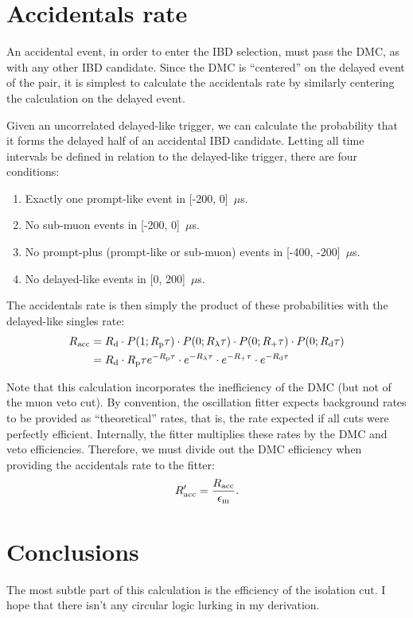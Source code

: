 \documentclass[../thesis.tex]{subfiles}
\begin{document}
\section{Accidentals rate}
\label{sec:accratecalc}

An accidental event, in order to enter the IBD selection, must pass the DMC, as
with any other IBD candidate. Since the DMC is ``centered'' on the delayed event
of the pair, it is simplest to calculate the accidentals rate by similarly
centering the calculation on the delayed event.

Given an uncorrelated delayed-like trigger, we can calculate the probability
that it forms the delayed half of an accidental IBD candidate. Letting all time
intervals be defined in relation to the delayed-like trigger, there are four
conditions:
\begin{enumerate}
\item Exactly one prompt-like event in [-200, 0]~$\mu$s.
\item No sub-muon events in [-200, 0]~$\mu$s.
\item No prompt-plus (prompt-like or sub-muon) events in [-400, -200]~$\mu$s.
\item No delayed-like events in [0, 200]~$\mu$s.
\end{enumerate}
The accidentals rate is then simply the product of these probabilities with the
delayed-like singles rate:
\begin{align}
  R_\mathrm{acc} &= R_\mathrm{d} \cdot P(1; R_\mathrm{p} \tau)\cdot P(0; R_\mathrm{\lambda} \tau)
           \cdot P(0; R_\mathrm{+} \tau)\cdot P(0; R_\mathrm{d} \tau) \nonumber \\
        &= R_\mathrm{d}\cdot R_\mathrm{p}\tau e^{-R_\mathrm{p}\tau}\cdot e^{-R_\mathrm{\lambda}\tau}
           \cdot e^{-R_\mathrm{+}\tau} \cdot e^{-R_\mathrm{d}\tau}
\end{align}

Note that this calculation incorporates the inefficiency of the DMC (but not of
the muon veto cut). By convention, the oscillation fitter expects background
rates to be provided as ``theoretical'' rates, that is, the rate expected if all
cuts were perfectly efficient. Internally, the fitter multiplies these rates by
the DMC and veto efficiencies. Therefore, we must divide out the DMC efficiency
when providing the accidentals rate to the fitter:
\begin{equation}
  R_\mathrm{acc}' = \frac{R_\mathrm{acc}}{\epsilon_\mathrm{m}}.
\end{equation}

\section{Conclusions}
\label{sec:accdmcconcl}

The most subtle part of this calculation is the efficiency of the isolation cut.
I hope that there isn't any circular logic lurking in my derivation.
\end{document}
